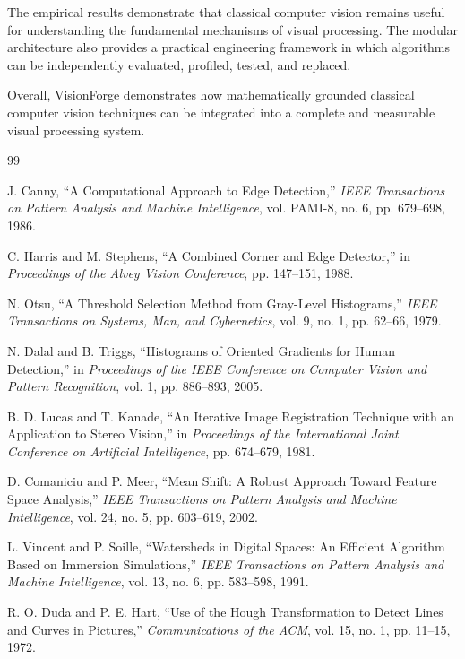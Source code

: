 \documentclass[11pt,a4paper]{article}
\begin{document}
The empirical results demonstrate that classical computer vision remains useful for understanding the fundamental mechanisms of visual processing. The modular architecture also provides a practical engineering framework in which algorithms can be independently evaluated, profiled, tested, and replaced.

Overall, VisionForge demonstrates how mathematically grounded classical computer vision techniques can be integrated into a complete and measurable visual processing system.


\begin{thebibliography}{99}

J. Canny,
``A Computational Approach to Edge Detection,''
\textit{IEEE Transactions on Pattern Analysis and Machine Intelligence},
vol. PAMI-8, no. 6, pp. 679--698, 1986.

C. Harris and M. Stephens,
``A Combined Corner and Edge Detector,''
in \textit{Proceedings of the Alvey Vision Conference},
pp. 147--151, 1988.

N. Otsu,
``A Threshold Selection Method from Gray-Level Histograms,''
\textit{IEEE Transactions on Systems, Man, and Cybernetics},
vol. 9, no. 1, pp. 62--66, 1979.

N. Dalal and B. Triggs,
``Histograms of Oriented Gradients for Human Detection,''
in \textit{Proceedings of the IEEE Conference on Computer Vision and Pattern Recognition},
vol. 1, pp. 886--893, 2005.

B. D. Lucas and T. Kanade,
``An Iterative Image Registration Technique with an Application to Stereo Vision,''
in \textit{Proceedings of the International Joint Conference on Artificial Intelligence},
pp. 674--679, 1981.

D. Comaniciu and P. Meer,
``Mean Shift: A Robust Approach Toward Feature Space Analysis,''
\textit{IEEE Transactions on Pattern Analysis and Machine Intelligence},
vol. 24, no. 5, pp. 603--619, 2002.

L. Vincent and P. Soille,
``Watersheds in Digital Spaces: An Efficient Algorithm Based on Immersion Simulations,''
\textit{IEEE Transactions on Pattern Analysis and Machine Intelligence},
vol. 13, no. 6, pp. 583--598, 1991.

R. O. Duda and P. E. Hart,
``Use of the Hough Transformation to Detect Lines and Curves in Pictures,''
\textit{Communications of the ACM},
vol. 15, no. 1, pp. 11--15, 1972.

\end{thebibliography}

\end{document}
